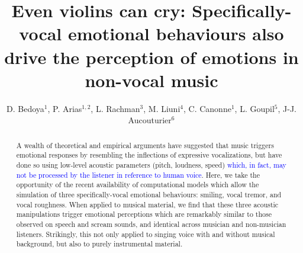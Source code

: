 \documentclass[openacc]{rsprocb_new}%
\begin{document}
\title{Even violins can cry: Specifically-vocal emotional behaviours also drive the perception of emotions in non-vocal music}

\author{%
D. Bedoya$^{1}$, P. Arias$^{1,2}$, L. Rachman$^{3}$,  M. Liuni$^{4}$, C. Canonne$^{1}$, L. Goupil$^{5}$, J-J. Aucouturier$^{6}$}

\address{$^{1}$ Science and Technology of Music and Sound, IRCAM/CNRS/Sorbonne Université, Paris (France).\\
$^{2}$ Dept of Cognitive Science, Lund University, Lund (Sweden)\\
$^{3}$ Faculty of Medical Sciences, University of Groningen, Groningen (NL)\\
$^{4}$ Alta Voce SAS, Houilles (FR)\\
$^{5}$ BabyDevLab, University of East London, London (UK)\\
$^{6}$ FEMTO-ST Institute, Univ. Bourgogne Franche-Comté / CNRS, Besançon (France)\\
}

\subject{BIOLOGY: behaviour, cognition}



\begin{abstract}
A wealth of theoretical and empirical arguments have suggested that music triggers emotional responses by resembling the inflections of expressive vocalizations, but have done so using low-level acoustic parameters (pitch, loudness, speed) \textcolor{blue}{which, in fact, may not be processed by the listener in reference to human voice}. Here, we take the opportunity of the recent availability of computational models which allow the simulation of three specifically-vocal emotional behaviours: smiling, vocal tremor, and vocal roughness. When applied to musical material, we find that these three acoustic manipulations trigger emotional perceptions which are remarkably similar to those observed on speech and scream sounds, and identical across musician and non-musician listeners. Strikingly, this not only applied to singing voice with and without musical background, but also to purely instrumental material. 
\end{abstract}
\end{document}

